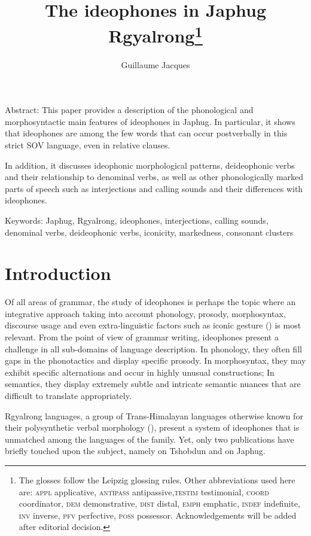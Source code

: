 \documentclass[oldfontcommands,oneside,a4paper,11pt]{article}
\begin{document}
 
 \title{The ideophones in Japhug Rgyalrong\footnote{
The glosses follow the Leipzig glossing rules. Other abbreviations used here are: \textsc{appl} applicative, \textsc{antipass} antipassive,\textsc{testim} testimonial, \textsc{coord} coordinator, \textsc{dem} demonstrative, \textsc{dist} distal, \textsc{emph} emphatic, \textsc{indef} indefinite, \textsc{inv} inverse,  \textsc{pfv} perfective, \textsc{poss} possessor. %
Acknowledgements will be added after editorial decision.  %
} }
\author{Guillaume Jacques}
\maketitle
\linenumbers
 
Abstract: This paper provides a   description of the phonological and morphosyntactic main features of ideophones in Japhug. In particular, it shows that ideophones are among the few words that can occur postverbally in this strict SOV language, even in relative clauses.

In addition, it discusses  ideophonic morphological patterns, deideophonic verbs and their relationship to   denominal verbs, as well as other phonologically marked parts of speech such as interjections and calling sounds and their differences with ideophones.

Keywords: Japhug, Rgyalrong, ideophones, interjections, calling sounds, denominal verbs, deideophonic verbs, iconicity, markedness, consonant clusters


 \section{Introduction}
Of all areas of grammar, the study of ideophones is perhaps the   topic where an integrative approach taking into account phonology, prosody, morphosyntax, discourse usage and even extra-linguistic factors such as iconic gesture (\citealt{dingemanse11phd}) is most relevant. From the point of view of grammar writing, ideophones present a challenge in all sub-domains of language description. In phonology, they often fill gaps in the phonotactics and display specific prosody. In morphosyntax, they may exhibit specific alternations and occur in highly unusual constructions; In semantics, they display extremely subtle and intricate semantic nuances that are   difficult to translate appropriately.


 Rgyalrong languages, a group of Trans-Himalayan languages otherwise known for their polysynthetic verbal morphology (\citealt{jacques12incorp}), present a system of ideophones that is   unmatched   among the languages of the family. Yet, only two publications have briefly touched upon the subject, namely \citet{jackson04zhuangmaoci} on Tshobdun and \citet[305-17]{jacques08zh} on Japhug. 
 
\end{document}

